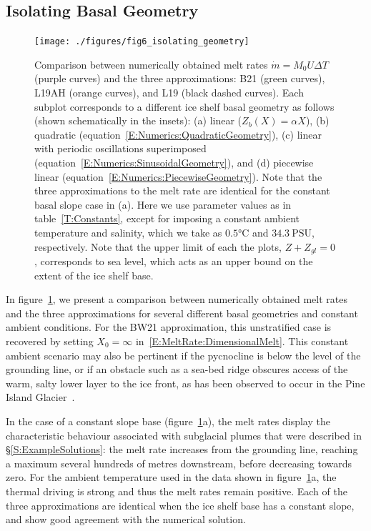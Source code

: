\documentclass[openacc]{rsproca_new}%
\begin{document}
\subsection{Isolating Basal Geometry}\label{S:Numerics:NoPycnocline}
\begin{figure}
\centering
\texttt{[image: ./figures/fig6\_isolating\_geometry]}
\caption{Comparison between numerically obtained melt rates $\dot{m}= M_0 U \Delta T$ (purple curves) and the three approximations: B21 (green curves), L19AH (orange curves), and L19 (black dashed curves). Each subplot corresponds to a different ice shelf basal geometry as follows (shown schematically in the insets): (a) linear ($Z_b(X) = \alpha X$), (b) quadratic (equation~\eqref{E:Numerics:QuadraticGeometry}), (c) linear with periodic oscillations superimposed (equation~\eqref{E:Numerics:SinusoidalGeometry}), and (d) piecewise linear (equation~\eqref{E:Numerics:PiecewiseGeometry}). Note that the three approximations to the melt rate are identical for the constant basal slope case in (a).  Here we use parameter values as in table~\ref{T:Constants}, except for imposing a constant ambient temperature and salinity, which we take as $ 0.5\si{\celsius}$ and $34.3~\text{PSU}$, respectively. Note that the upper limit of each the plots, $Z + Z_{gl} = 0$, corresponds to sea level, which acts as an upper bound on the extent of the ice shelf base.}   \label{fig:Numerics:Geometry}
\end{figure}

In figure~\ref{fig:Numerics:Geometry}, we present a comparison between numerically obtained melt rates and the three approximations for several different basal geometries and constant ambient conditions. For the BW21 approximation, this unstratified case is recovered by setting $X_0 = \infty$ in~\eqref{E:MeltRate:DimensionalMelt}. This constant ambient scenario may also be pertinent if the pycnocline is below the level of the grounding line, or if an obstacle such as a sea-bed ridge obscures access of the warm, salty lower layer to the ice front, as has been observed to occur in the Pine Island Glacier~\citep{DeRydt2014JGeophysResOceans}. 

In the case of a constant slope base (figure~\ref{fig:Numerics:Geometry}a), the melt rates display the characteristic behaviour associated with subglacial plumes that were described in \S\ref{S:ExampleSolutions}: the melt rate increases from the grounding line, reaching a maximum several hundreds of metres downstream, before decreasing towards zero. For the ambient temperature used in the data shown in figure~\ref{fig:Numerics:Geometry}a, the thermal driving is strong and thus the melt rates remain positive. Each of the three approximations are identical when the ice shelf base has a constant slope, and show good agreement with the numerical solution.
\end{document}
